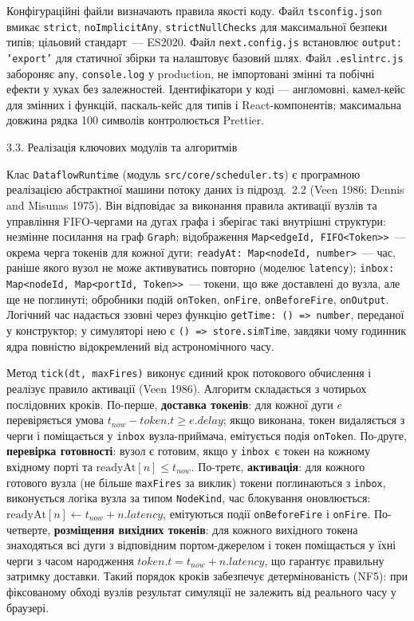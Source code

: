 Конфігураційні файли визначають правила якості коду. Файл
\texttt{tsconfig.json} вмикає \texttt{strict}, \texttt{noImplicitAny},
\texttt{strictNullChecks} для максимальної безпеки типів; цільовий
стандарт~--- ES2020. Файл \texttt{next.config.js} встановлює
\texttt{output: 'export'} для статичної збірки та налаштовує базовий
шлях. Файл \texttt{.eslintrc.js} забороняє \texttt{any},
\texttt{console.log} у production, не імпортовані змінні та побічні
ефекти у хуках без залежностей. Ідентифікатори у коді --- англомовні,
камел-кейс для змінних і функцій, паскаль-кейс для типів і
React-компонентів; максимальна довжина рядка 100 символів контролюється
Prettier.

\protect{}\label{_Toc229681134}{}3.3. Реалізація ключових
модулів та алгоритмів

Клас \texttt{DataflowRuntime} (модуль \texttt{src/core/scheduler.ts}) є
програмною реалізацією абстрактної машини потоку даних із підрозд.~2.2
(Veen 1986; Dennis and Misunas 1975). Він відповідає за виконання правила
активації вузлів та управління FIFO-чергами на дугах графа і зберігає
такі внутрішні структури: незмінне посилання на граф \texttt{Graph};
відображення \texttt{Map<edgeId, FIFO<Token>>}~--- окрема черга токенів
для кожної дуги; \texttt{readyAt: Map<nodeId, number>}~--- час, раніше
якого вузол не може активуватись повторно (моделює \texttt{latency});
\texttt{inbox: Map<nodeId, Map<portId, Token>>}~--- токени, що вже
доставлені до вузла, але ще не поглинуті; обробники подій
\texttt{onToken}, \texttt{onFire}, \texttt{onBeforeFire},
\texttt{onOutput}. Логічний час надається ззовні через функцію
\texttt{getTime: () => number}, переданої у конструктор; у симуляторі нею
є \texttt{() => store.simTime}, завдяки чому годинник ядра повністю
відокремлений від астрономічного часу.

Метод \texttt{tick(dt, maxFires)} виконує єдиний крок потокового
обчислення і реалізує правило активації (Veen 1986). Алгоритм складається
з чотирьох послідовних кроків. По-перше, \textbf{доставка токенів}: для
кожної дуги \(e\) перевіряється умова
\(t_{now}-token.t\geq e.delay\); якщо виконана, токен видаляється з черги
і поміщається у \texttt{inbox} вузла-приймача, емітується подія
\texttt{onToken}. По-друге, \textbf{перевірка готовності}: вузол є
готовим, якщо у \texttt{inbox}~є токен на кожному вхідному порті та
\(\text{readyAt}[n]\leq t_{now}\). По-третє, \textbf{активація}: для
кожного готового вузла (не більше \texttt{maxFires} за виклик) токени
поглинаються з \texttt{inbox}, виконується логіка вузла за типом
\texttt{NodeKind}, час блокування оновлюється:
\(\text{readyAt}[n]\leftarrow t_{now}+n.latency\), емітуються події
\texttt{onBeforeFire} і \texttt{onFire}. По-четверте,
\textbf{розміщення вихідних токенів}: для кожного вихідного токена
знаходяться всі дуги з відповідним портом-джерелом і токен поміщається у
їхні черги з часом народження \(token.t = t_{now}+n.latency\), що
гарантує правильну затримку доставки. Такий порядок кроків забезпечує
детермінованість (NF5): при фіксованому обході вузлів результат симуляції
не залежить від реального часу у браузері.

